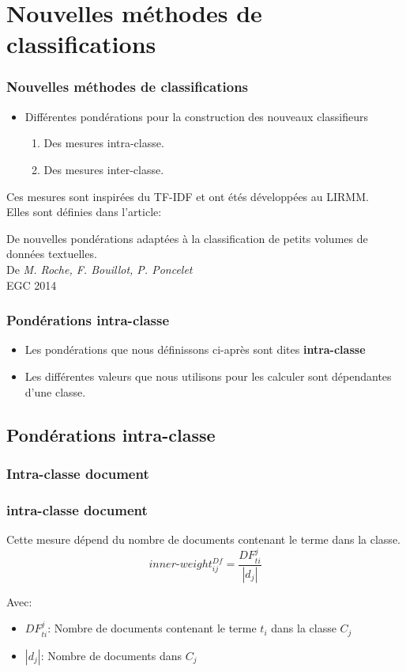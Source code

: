 \documentclass[12pt]{beamer}
\begin{document}
\section{Nouvelles méthodes de classifications}

\begin{frame}
\frametitle{Nouvelles méthodes de classifications}
\begin{itemize}
\item Différentes pondérations pour la construction des nouveaux classifieurs
\begin{enumerate}
\item Des mesures intra-classe.
\item Des mesures inter-classe.
\end{enumerate}
\end{itemize}
Ces mesures sont inspirées du TF-IDF et ont étés développées au LIRMM.\\
Elles sont définies dans l'article:
\begin{center}
De nouvelles pondérations adaptées à la classification de petits volumes de données textuelles.\\
De \textit{M. Roche, F. Bouillot, P. Poncelet}\\
EGC 2014
\end{center}

\end{frame}

\begin{frame}
\frametitle{Pondérations intra-classe}
\begin{itemize}
\item Les pondérations que nous définissons ci-après sont dites \textbf{intra-classe} 
\item Les différentes valeurs que nous utilisons pour les calculer sont dépendantes d'une classe.
\end{itemize}
\end{frame}

\begin{frame}
\subsection{Pondérations intra-classe}
\frametitle{Intra-classe document}
\subsubsection*{intra-classe document}

Cette mesure dépend du nombre de documents contenant le terme dans la classe.
  \[ inner\mbox{-}weight_{ij}^{Df} = \frac{DF_{ti}^j}{|d_{j}|}\]
  
      Avec:
  \begin{itemize}
  	\item $DF_{ti}^j$: Nombre de documents contenant le terme $t_i$ dans la classe $C_j$	
  	\item $|d_{j}|$: Nombre de documents dans $C_j$	
    \end{itemize}
\end{frame}
\end{document}
